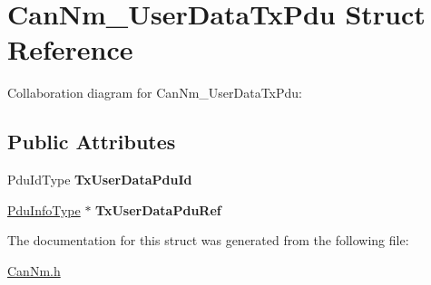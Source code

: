 \hypertarget{structCanNm__UserDataTxPdu}{}\section{Can\+Nm\+\_\+\+User\+Data\+Tx\+Pdu Struct Reference}
\label{structCanNm__UserDataTxPdu}


Collaboration diagram for Can\+Nm\+\_\+\+User\+Data\+Tx\+Pdu\+:
\subsection*{Public Attributes}
\begin{DoxyCompactItemize}
\item 
Pdu\+Id\+Type {\bfseries Tx\+User\+Data\+Pdu\+Id}\hypertarget{structCanNm__UserDataTxPdu_a4e13e93c114acb3aec7d75eabf18410b}{}\label{structCanNm__UserDataTxPdu_a4e13e93c114acb3aec7d75eabf18410b}

\item 
\hyperlink{structPduInfoType}{Pdu\+Info\+Type} $\ast$ {\bfseries Tx\+User\+Data\+Pdu\+Ref}\hypertarget{structCanNm__UserDataTxPdu_a5305750999380d0c58b99b05ae89522f}{}\label{structCanNm__UserDataTxPdu_a5305750999380d0c58b99b05ae89522f}

\end{DoxyCompactItemize}


The documentation for this struct was generated from the following file\+:\begin{DoxyCompactItemize}
\item 
\hyperlink{CanNm_8h}{Can\+Nm.\+h}\end{DoxyCompactItemize}
